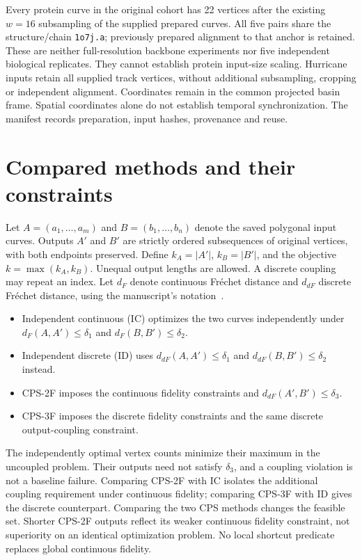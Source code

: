Every protein curve in the original cohort has 22 vertices after the existing $w=16$ subsampling of the supplied prepared curves. All five pairs share the structure/chain \texttt{1o7j.a}; previously prepared alignment to that anchor is retained. These are neither full-resolution backbone experiments nor five independent biological replicates. They cannot establish protein input-size scaling. Hurricane inputs retain all supplied track vertices, without additional subsampling, cropping or independent alignment. Coordinates remain in the common projected basin frame. Spatial coordinates alone do not establish temporal synchronization. The manifest records preparation, input hashes, provenance and reuse.


\section{Compared methods and their constraints}
Let $A=(a_1,\ldots,a_m)$ and $B=(b_1,\ldots,b_n)$ denote the saved polygonal input curves. Outputs $A'$ and $B'$ are strictly ordered subsequences of original vertices, with both endpoints preserved. Define $k_A=|A'|$, $k_B=|B'|$, and the objective $k=\max(k_A,k_B)$. Unequal output lengths are allowed. A discrete coupling may repeat an index. Let $d_F$ denote continuous Fr\'echet distance and $d_{dF}$ discrete Fr\'echet distance, using the manuscript's notation~\cite{manuscript}.
\begin{itemize}
\item Independent continuous (IC) optimizes the two curves independently under $d_F(A,A')\leq\delta_1$ and $d_F(B,B')\leq\delta_2$.
\item Independent discrete (ID) uses $d_{dF}(A,A')\leq\delta_1$ and $d_{dF}(B,B')\leq\delta_2$ instead.
\item CPS-2F imposes the continuous fidelity constraints and $d_{dF}(A',B')\leq\delta_3$.
\item CPS-3F imposes the discrete fidelity constraints and the same discrete output-coupling constraint.
\end{itemize}
The independently optimal vertex counts minimize their maximum in the uncoupled problem. Their outputs need not satisfy $\delta_3$, and a coupling violation is not a baseline failure. Comparing CPS-2F with IC isolates the additional coupling requirement under continuous fidelity; comparing CPS-3F with ID gives the discrete counterpart. Comparing the two CPS methods changes the feasible set. Shorter CPS-2F outputs reflect its weaker continuous fidelity constraint, not superiority on an identical optimization problem. No local shortcut predicate replaces global continuous fidelity.

